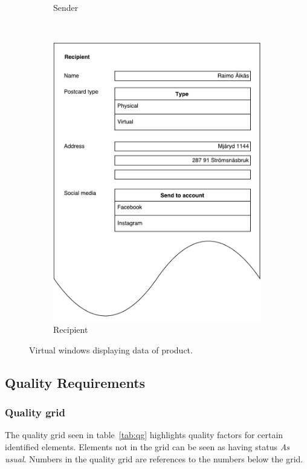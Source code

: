 \documentclass[10pt,a4paper]{article}
\begin{document}
\begin{figure}[!ht]
\begin{subfigure}{0.3\textwidth}
\caption{Sender}
\label{fig:virtualwindows_sender}
\end{subfigure}\hfill
~
\begin{subfigure}{0.3\textwidth}
\includegraphics[width=\linewidth]{Data_figures/virtualwindows_recipient.pdf}
\caption{Recipient}
\label{fig:virtualwindows_recipient}
\end{subfigure}
\caption{Virtual windows displaying data of product.}
\label{fig:vw}

\end{figure}



\subsection{Quality Requirements}



\subsubsection{Quality grid}
The quality grid seen in table~\ref{tab:qg} highlights quality factors for certain identified elements. Elements not in the grid can be seen as having status \textit{As usual}. Numbers in the quality grid are references to the numbers below the grid. 
\end{document}
